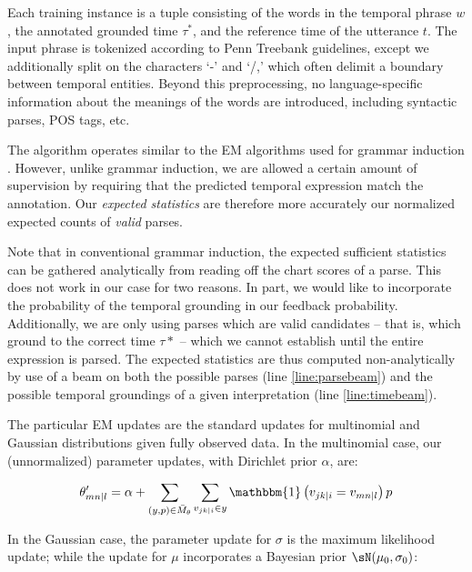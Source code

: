 Each training instance is a tuple consisting of the words in the temporal
	phrase $w$, the annotated grounded time $\tau^*$, and the reference time
	of the utterance $t$.
The input phrase is tokenized according to Penn Treebank guidelines,
	except we additionally split on the characters `-' and `/,' which
	often delimit a boundary between temporal entities.
Beyond this preprocessing, no language-specific information about the meanings
	of the words are introduced, including syntactic parses, POS tags, etc.

The algorithm operates similar to the EM algorithms used for grammar induction
	\cite{key:2004klein-induction,key:1992carroll-induction}.
However, unlike grammar induction, we are allowed a certain amount of
	supervision by requiring that the predicted temporal expression
	match the annotation.
Our \textit{expected statistics} are therefore more accurately our normalized
	expected counts of \textit{valid} parses.

Note that in conventional grammar induction, the expected sufficient statistics
	can be gathered analytically from reading off the chart scores of a parse.
This does not work in our case for two reasons.
In part, we would like to incorporate the probability of the temporal
	grounding in our feedback probability.
Additionally, we are only using parses which are valid candidates -- that is,
	which ground to the correct time $\tau*$ -- which we cannot establish
	until the entire expression is parsed.
The expected statistics are thus computed non-analytically by use of
	a beam on both the possible parses (line \ref{line:parsebeam}) and the
	possible temporal groundings of a given interpretation (line
	\ref{line:timebeam}).

The particular EM updates are the standard
	updates for multinomial and Gaussian distributions given fully observed data.
In the multinomial case, our (unnormalized) parameter updates, with
	Dirichlet prior $\alpha$, are:

\begin{equation}
	\theta_{mn \mid l}' =
		\alpha + 
		\sum\limits_{(y,p) \in \bar M_\theta} \sum\limits_{v_{jk \mid i} \in y}
			\mathbbm{1}\left(v_{jk \mid i} = v_{mn \mid l}\right) p
\label{eqn:multinomialEM}
\end{equation}

In the Gaussian case, the parameter update for $\sigma$ is the maximum
	likelihood update; while the update for $\mu$ incorporates a
	Bayesian prior $\sN(\mu_0,\sigma_0)$:

